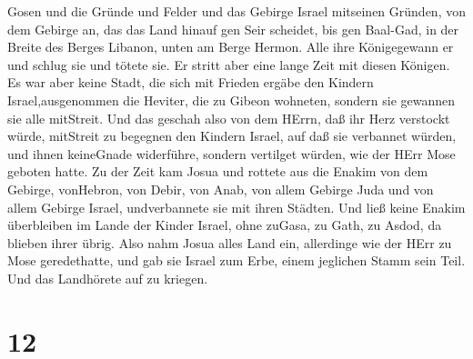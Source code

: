 Gosen und die Gründe und Felder und das Gebirge Israel mitseinen
Gründen,  von dem Gebirge an, das das Land hinauf gen Seir
scheidet, bis gen Baal-Gad, in der Breite des Berges Libanon, unten am
Berge Hermon. Alle ihre Königegewann er und schlug sie und tötete sie.
 Er stritt aber eine lange Zeit mit diesen Königen.
 Es war aber keine Stadt, die sich mit Frieden ergäbe den
Kindern Israel,ausgenommen die Heviter, die zu Gibeon wohneten, sondern
sie gewannen sie alle mitStreit.  Und das geschah also von
dem HErrn, daß ihr Herz verstockt würde, mitStreit zu begegnen den
Kindern Israel, auf daß sie verbannet würden, und ihnen keineGnade
widerführe, sondern vertilget würden, wie der HErr Mose geboten hatte.
 Zu der Zeit kam Josua und rottete aus die Enakim von dem
Gebirge, vonHebron, von Debir, von Anab, von allem Gebirge Juda und von
allem Gebirge Israel, undverbannete sie mit ihren Städten. 
Und ließ keine Enakim überbleiben im Lande der Kinder Israel, ohne
zuGasa, zu Gath, zu Asdod, da blieben ihrer übrig.  Also
nahm Josua alles Land ein, allerdinge wie der HErr zu Mose geredethatte,
und gab sie Israel zum Erbe, einem jeglichen Stamm sein Teil. Und das
Landhörete auf zu kriegen.

\hypertarget{section-11}{%
\section{12}\label{section-11}}


